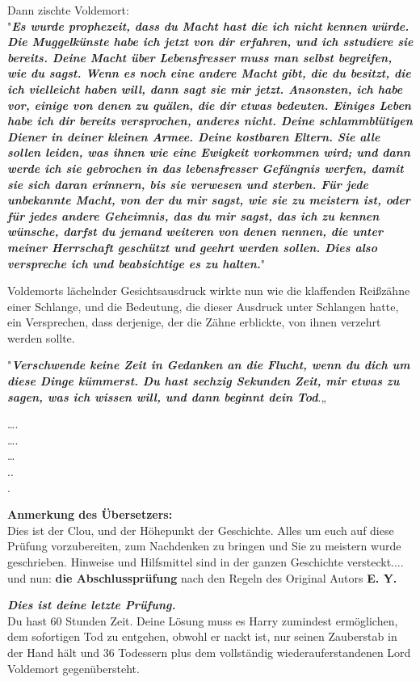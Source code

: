 {Dann zischte Voldemort:\\ "\textbf{\emph{Es wurde prophezeit, dass du Macht hast die ich nicht kennen würde. Die Muggelkünste habe ich jetzt von dir erfahren, und ich sstudiere sie bereits. Deine Macht über Lebensfresser muss man selbst begreifen, wie du sagst. Wenn es noch eine andere Macht gibt, die du besitzt, die ich vielleicht haben will, dann sagt sie mir jetzt. Ansonsten, ich habe vor, einige von denen zu quälen, die dir etwas bedeuten. Einiges Leben habe ich dir bereits versprochen, anderes nicht. Deine schlammblütigen Diener in deiner kleinen Armee. Deine kostbaren Eltern. Sie alle sollen leiden, was ihnen wie eine Ewigkeit vorkommen wird; und dann werde ich sie gebrochen in das lebensfresser Gefängnis werfen, damit sie sich daran erinnern, bis sie verwesen und sterben. Für jede unbekannte Macht, von der du mir sagst, wie sie zu meistern ist, oder für jedes andere Geheimnis, das du mir sagst, das ich zu kennen wünsche, darfst du jemand weiteren von denen nennen, die unter meiner Herrschaft geschützt und geehrt werden sollen. Dies also verspreche ich und beabsichtige es zu halten.}}"

Voldemorts lächelnder Gesichtsausdruck wirkte nun wie die klaffenden Reißzähne einer Schlange, und die Bedeutung, die dieser Ausdruck unter Schlangen hatte, ein Versprechen, dass derjenige, der die Zähne erblickte, von ihnen verzehrt werden sollte.

"\textbf{\emph{Verschwende keine Zeit in Gedanken an die Flucht, wenn du dich um diese Dinge kümmerst. Du hast sechzig Sekunden Zeit, mir etwas zu sagen, was ich wissen will, und dann beginnt dein Tod}}.„

….\\ ….\\ …\\ ..\\ .

\textbf{Anmerkung des Übersetzers:}\\ Dies ist der Clou, und der Höhepunkt der Geschichte. Alles um euch auf diese Prüfung vorzubereiten, zum Nachdenken zu bringen und Sie zu meistern wurde geschrieben. Hinweise und Hilfsmittel sind in der ganzen Geschichte versteckt.... und nun: \textbf{die Abschlussprüfung} nach den Regeln des Original Autors \textbf{E. Y.}

\hfill\break \emph{\hfill\break \textbf{Dies ist deine letzte Prüfung.}}\\ Du hast 60 Stunden Zeit. Deine Lösung muss es Harry zumindest ermöglichen, dem sofortigen Tod zu entgehen, obwohl er nackt ist, nur seinen Zauberstab in der Hand hält und 36 Todessern plus dem vollständig wiederauferstandenen Lord Voldemort gegenübersteht.

}

